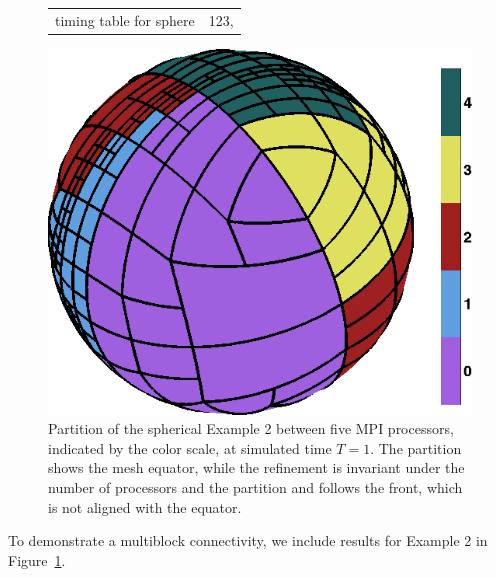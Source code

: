 \documentclass{IOS-Book-Article}     %
\newcommand{\forestclaw}{Forestclaw\xspace}
\newcommand{\pforest}{\texttt{p4est}\xspace}
\newcommand{\Fig}[1]{Figure~\ref{fig:#1}}
\begin{document}
\begin{figure}
  \begin{center}
  \begin{minipage}{.4\columnwidth}
    \begin{tabular}{cc}
      timing table for sphere & 123, \\
    \end{tabular}
  \end{minipage}
  \hspace{.05\columnwidth}
  \includegraphics[width=.4\columnwidth]{../figs_misc/sphere_partition5}
\end{center}
\caption{Partition of the spherical Example 2 between five MPI processors, indicated
  by the color scale, at simulated time $T = 1$.  The partition shows the mesh equator,
  while the refinement is invariant under the number of processors and the partition
and follows the front, which is not aligned with the equator.}
\label{fig:spherical}
\end{figure}
To demonstrate a multiblock connectivity, we include results for Example 2 in
\Fig{spherical}.














% 
\end{document}
